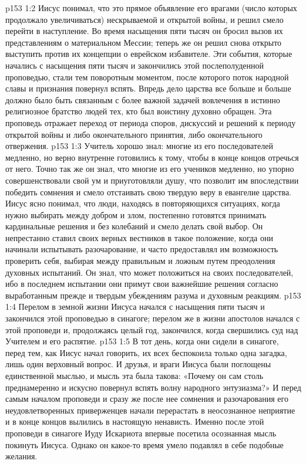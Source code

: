 \vs p153 1:2 Иисус понимал, что это прямое объявление его врагами (число которых продолжало увеличиваться) нескрываемой и открытой войны, и решил смело перейти в наступление. Во время насыщения пяти тысяч он бросил вызов их представлениям о материальном Мессии; теперь же он решил снова открыто выступить против их концепции о еврейском избавителе. Эти события, которые начались с насыщения пяти тысяч и закончились этой послеполуденной проповедью, стали тем поворотным моментом, после которого поток народной славы и признания повернул вспять. Впредь дело царства все больше и больше должно было быть связанным с более важной задачей вовлечения в истинно религиозное братство людей тех, кто был воистину духовно обращен. Эта проповедь отражает переход от периода споров, дискуссий и решений к периоду открытой войны и либо окончательного принятия, либо окончательного отвержения.
\vs p153 1:3 Учитель хорошо знал: многие из его последователей медленно, но верно внутренне готовились к тому, чтобы в конце концов отречься от него. Точно так же он знал, что многие из его учеников медленно, но упорно совершенствовали свой ум и приуготовляли душу, что позволит им впоследствии победить сомнения и смело отстаивать свою твердую веру в евангелие царства. Иисус ясно понимал, что люди, находясь в повторяющихся ситуациях, когда нужно выбирать между добром и злом, постепенно готовятся принимать кардинальные решения и без колебаний и смело делать свой выбор. Он непрестанно ставил своих верных вестников в такое положение, когда они начинали испытывать разочарование, и часто предоставлял им возможность проверить себя, выбирая между правильным и ложным путем преодоления духовных испытаний. Он знал, что может положиться на своих последователей, ибо в последнем испытании они примут свои важнейшие решения согласно выработанным прежде и твердым убеждениям разума и духовным реакциям.
\vs p153 1:4 \pc Перелом в земной жизни Иисуса начался с насыщения пяти тысяч и закончился этой проповедью в синагоге; перелом же в жизни апостолов начался с этой проповеди и, продолжаясь целый год, закончился, когда свершились суд над Учителем и его распятие.
\vs p153 1:5 \pc В тот день, когда они сидели в синагоге, перед тем, как Иисус начал говорить, их всех беспокоила только одна загадка, лишь один верховный вопрос. И друзья, и враги Иисуса были поглощены единственной мыслью, и мысль эта была такова: «Почему он сам столь преднамеренно и искусно повернул вспять волну народного энтузиазма?» И перед самым началом проповеди и сразу же после нее сомнения и разочарования его неудовлетворенных приверженцев начали перерастать в неосознанное неприятие и в конце концов вылились в настоящую ненависть. Именно после этой проповеди в синагоге Иуду Искариота впервые посетила осознанная мысль покинуть Иисуса. Однако он какое\hyp{}то время умело подавлял в себе подобные желания.
